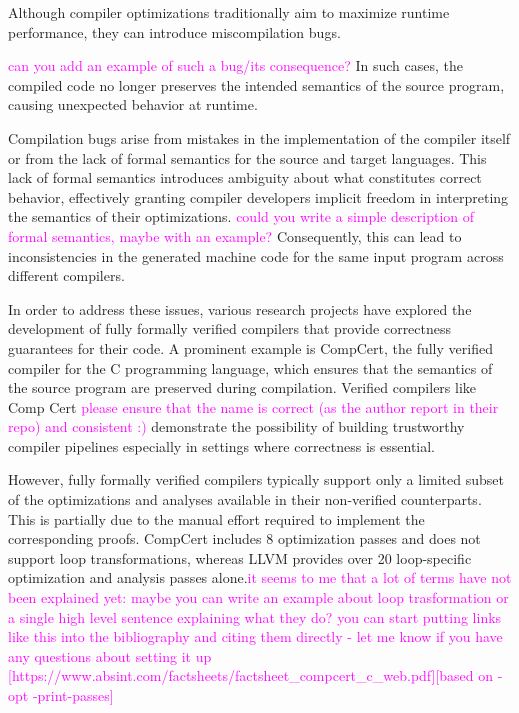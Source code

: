 Although compiler optimizations traditionally aim to maximize runtime performance, they can introduce miscompilation bugs.

\textcolor{magenta}{can you add an example of such a bug/its consequence?}
In such cases, the compiled code no longer preserves the intended semantics of the source program, 
causing unexpected behavior at runtime.

Compilation bugs arise from mistakes in the implementation of the compiler itself or from the lack of 
formal semantics for the source and target languages. 
This lack of formal semantics introduces ambiguity about what constitutes correct behavior, 
effectively granting compiler developers implicit freedom in interpreting the semantics of their optimizations. 
\textcolor{magenta}{could you write a simple description of formal semantics, maybe with an example?}
Consequently, this can lead to inconsistencies in the generated machine code for the same input 
program across different compilers.

In order to address these issues, various research projects have explored the development of fully formally verified compilers 
that provide correctness guarantees for their code. A prominent example is CompCert, the fully verified compiler for the 
C programming language, which ensures that the semantics of the source program are preserved during compilation. 
Verified compilers like Comp Cert\textcolor{magenta}{ please ensure that the name is correct (as the author report in their repo) and consistent :)} 
demonstrate the possibility of building trustworthy compiler pipelines especially in settings where correctness is essential.  

However, fully formally verified compilers typically support only a limited subset of the optimizations 
and analyses available in their non-verified counterparts. This is partially due to the manual effort required to 
implement the corresponding proofs. CompCert includes 8 optimization passes and does not support loop transformations, 
whereas LLVM provides over 20 loop-specific optimization and analysis passes alone.\textcolor{magenta}{it seems to me that 
a lot of terms have not been explained yet: maybe you can write an example about loop trasformation or a single 
high level sentence explaining what they do?}
\textcolor{magenta}{you can start putting links like this into the bibliography and citing them directly - let me know if you 
have any questions about setting it up
[https://www.absint.com/factsheets/factsheet\_compcert\_c\_web.pdf][based on -opt -print-passes]}

